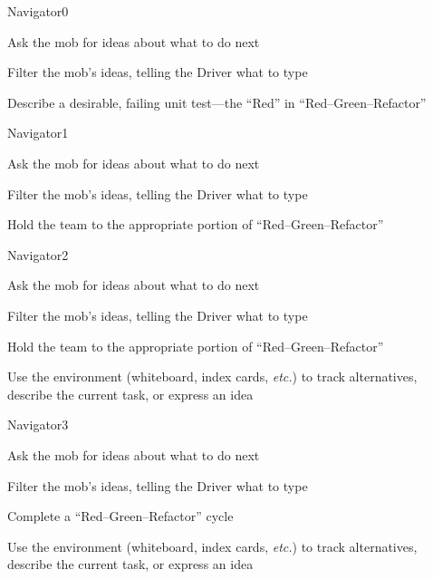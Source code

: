\documentclass[letterpaper,20pt]{extarticle}
\begin{document}
\begin{role}{Navigator}{0}
  \item Ask the mob for ideas about what to do next
  \item Filter the mob's ideas, telling the Driver what to type
  \item Describe a desirable, failing unit test---the ``Red'' in ``Red--Green--Refactor''
\end{role}

\begin{role}{Navigator}{1}
  \item Ask the mob for ideas about what to do next
  \item Filter the mob's ideas, telling the Driver what to type
  \item Hold the team to the appropriate portion of ``Red--Green--Refactor''
\end{role}

\begin{role}{Navigator}{2}
  \item Ask the mob for ideas about what to do next
  \item Filter the mob's ideas, telling the Driver what to type
  \item Hold the team to the appropriate portion of ``Red--Green--Refactor''
  \item Use the environment (whiteboard, index cards, \textit{etc.}) to
    track alternatives, describe the current task, or express
    an idea
\end{role}

\begin{role}{Navigator}{3}
  \item Ask the mob for ideas about what to do next
  \item Filter the mob's ideas, telling the Driver what to type
  \item Complete a ``Red--Green--Refactor'' cycle
  \item Use the environment (whiteboard, index cards, \textit{etc.}) to
    track alternatives, describe the current task, or express
    an idea
\end{role}
\end{document}
